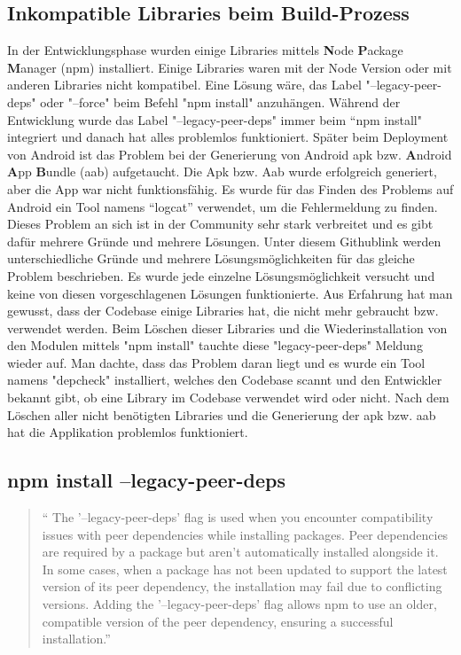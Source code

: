 \begin{spacing}{1}
    \section{Inkompatible Libraries beim Build-Prozess}\label{sec:inkompatible-libraries-beim-build-prozess}
    In der Entwicklungsphase wurden einige Libraries mittels \textbf{N}ode  \textbf{P}ackage \textbf{M}anager (npm) installiert.
    Einige Libraries waren mit der Node Version oder mit anderen Libraries nicht kompatibel.
    Eine Lösung wäre, das Label "--legacy-peer-deps" oder "--force" beim Befehl "npm install" anzuhängen.
    Während der Entwicklung wurde das Label "--legacy-peer-deps" immer beim “npm install" integriert
    und danach hat alles problemlos funktioniert.
    Später beim Deployment von Android ist das Problem
    bei der Generierung von Android apk bzw.
    \textbf{A}ndroid \textbf{A}pp \textbf{B}undle (aab) aufgetaucht.
    Die Apk bzw.
    Aab wurde erfolgreich generiert, aber die App war nicht funktionsfähig.
    Es wurde für das Finden des Problems auf Android ein Tool namens “logcat” verwendet,
    um die Fehlermeldung zu finden.
    Dieses Problem an sich ist in der Community sehr stark verbreitet und es gibt dafür mehrere Gründe und mehrere Lösungen.
    Unter diesem Githublink \cite{libjsexecutor} werden unterschiedliche Gründe und mehrere
    Lösungsmöglichkeiten für das gleiche Problem beschrieben.
    Es wurde jede einzelne Lösungsmöglichkeit versucht und keine von diesen vorgeschlagenen Lösungen
    funktionierte.
    Aus Erfahrung hat man gewusst, dass der Codebase einige Libraries hat,
    die nicht mehr gebraucht bzw.
    verwendet werden. Beim Löschen dieser Libraries und die Wiederinstallation
    von den Modulen mittels "npm install" tauchte diese "legacy-peer-deps" Meldung wieder auf.
    Man dachte, dass das Problem daran liegt und es wurde  ein Tool namens "depcheck" installiert,
    welches den Codebase scannt und den Entwickler bekannt gibt, ob eine Library im Codebase verwendet
    wird oder nicht. \cite{depcheck}
    Nach dem Löschen aller nicht benötigten Libraries und die Generierung der
    apk bzw.
    aab hat die Applikation problemlos funktioniert.



    \subsection{npm install --legacy-peer-deps}\label{subsec:npm-install---legacy-peer-deps}
    \begin{quotation}
        ``
        The '--legacy-peer-deps' flag is used when you encounter compatibility issues with peer dependencies
        while installing packages.
        Peer dependencies are required by a package but aren't automatically
        installed alongside it.
        In some cases, when a package has not been updated to support the latest
        version of its peer dependency, the installation may fail due to conflicting versions.
        Adding the '--legacy-peer-deps' flag allows npm to use an older, compatible version of
        the peer dependency, ensuring a successful installation.''
        \cite{installFlags}
    \end{quotation}


\end{spacing}
